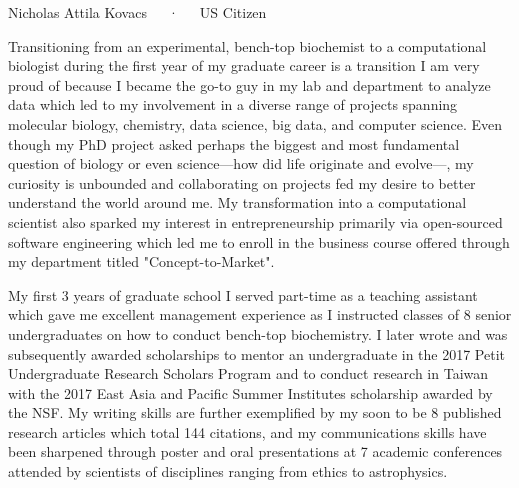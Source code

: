 \documentclass[11pt, letterpaper]{CV_latex_class}
\begin{document}
\makecvheader

\makecvfooter
  {Nicholas Attila Kovacs~~~·~~~US Citizen}

\makelettertitle

\begin{cvletter}


\hspace{1em} Transitioning from an experimental, bench-top biochemist to a computational biologist during the first year of my graduate career is a transition I am very proud of because I became the go-to guy in my lab and department to analyze data which led to my involvement in a diverse range of projects spanning molecular biology, chemistry, data science, big data, and computer science. Even though my PhD project asked perhaps the biggest and most fundamental question of biology or even science---how did life originate and evolve---, my curiosity is unbounded and collaborating on projects fed my desire to better understand the world around me. My transformation into a computational scientist also sparked my interest in entrepreneurship primarily via open-sourced software engineering which led me to enroll in the business course offered through my department titled "Concept-to-Market".

\hspace{1em} My first 3 years of graduate school I served part-time as a teaching assistant which gave me excellent management experience as I instructed classes of 8 senior undergraduates on how to conduct bench-top biochemistry. I later wrote and was subsequently awarded scholarships to mentor an undergraduate in the 2017 Petit Undergraduate Research Scholars Program and to conduct research in Taiwan with the 2017 East Asia and Pacific Summer Institutes scholarship awarded by the NSF. My writing skills are further exemplified by my soon to be 8 published research articles which total 144 citations, and my communications skills have been sharpened through poster and oral presentations at 7 academic conferences attended by scientists of disciplines ranging from ethics to astrophysics.


\end{cvletter}
\end{document}
